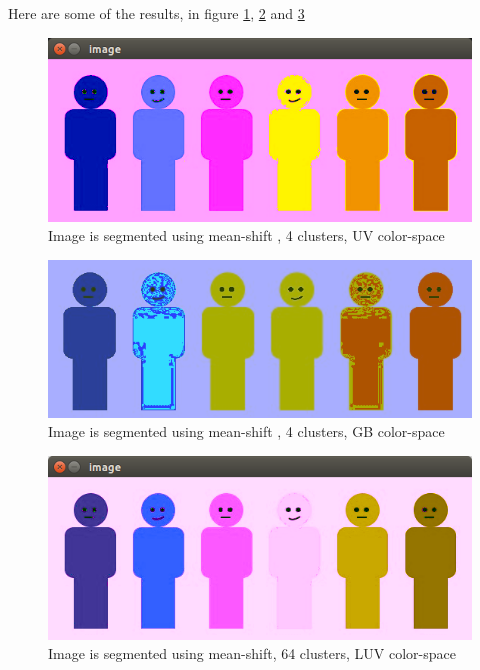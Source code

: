 \documentclass[letterpaper, 12 pt, conference ,onecolumn]{ieeeconf}  %
\begin{document}
Here are some of the results, in figure \ref{fig:mean-shift-4}, \ref{fig:mean-shift-4-rgb} and \ref{fig:mean-shift-64}
\begin{figure}[h!]
\includegraphics[width=0.4\paperwidth]{mean-shift/window128-4cluster}
\centering
\caption{Image is segmented using mean-shift , 4 clusters, UV color-space }
\label{fig:mean-shift-4}
\end{figure}

\begin{figure}[h!]
\includegraphics[width=0.4\paperwidth]{mean-shift/mean-shift-rgb-4}
\centering
\caption{Image is segmented using mean-shift , 4 clusters, GB color-space }
\label{fig:mean-shift-4-rgb}
\end{figure}

\begin{figure}[h!]
\includegraphics[width=0.4\paperwidth]{mean-shift/window32-64cluster}
\centering
\caption{Image is segmented using mean-shift, 64 clusters, LUV color-space }
\label{fig:mean-shift-64}
\end{figure}
\end{document}
